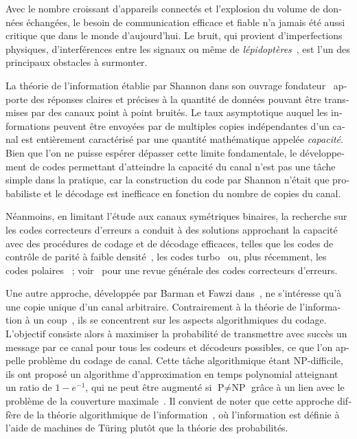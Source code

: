 \begin{otherlanguage}{french}
Avec le nombre croissant d'appareils connectés et l'explosion du volume de données échangées, le besoin de communication efficace et fiable n'a jamais été aussi critique que dans le monde d'aujourd'hui. Le bruit, qui provient d'imperfections physiques, d'interférences entre les signaux ou même de \emph{lépidoptères}~\cite{Hopper81}, est l'un des principaux obstacles à surmonter.

La théorie de l'information établie par Shannon dans son ouvrage fondateur~\cite{Shannon48} apporte des réponses claires et précises à la quantité de données pouvant être transmises par des canaux point à point bruités. Le taux asymptotique auquel les informations peuvent être envoyées par de multiples copies indépendantes d'un canal est entièrement caractérisé par une quantité mathématique appelée \emph{capacité}. Bien que l'on ne puisse espérer dépasser cette limite fondamentale, le développement de codes permettant d'atteindre la capacité du canal n'est pas une tâche simple dans la pratique, car la construction du code par Shannon n'était que probabiliste et le décodage est inefficace en fonction du nombre de copies du canal.

Néanmoins, en limitant l'étude aux canaux symétriques binaires, la recherche sur les codes correcteurs d'erreurs a conduit à des solutions approchant la capacité avec des procédures de codage et de décodage efficaces, telles que les codes de contrôle de parité à faible densité~\cite{Gallager62}, les codes turbo~\cite{BG96} ou, plus récemment, les codes polaires~\cite{Arikan09} ; voir~\cite{RU08} pour une revue générale des codes correcteurs d'erreurs.

Une autre approche, développée par Barman et Fawzi dans~\cite{BF18}, ne s'intéresse qu'à une copie unique d'un canal arbitraire. Contrairement à la théorie de l'information à un coup~\cite{RWW06,Tomamichel12,TBR16}, ils se concentrent sur les aspects algorithmiques du codage. L'objectif consiste alors à maximiser la probabilité de transmettre avec succès un message par ce canal pour tous les codeurs et décodeurs possibles, ce que l'on appelle problème du codage de canal. Cette tâche algorithmique étant \textrm{NP}-difficile, ils ont proposé un algorithme d'approximation en temps polynomial atteignant un ratio de $1-e^{-1}$, qui ne peut être augmenté si $\textrm{P}\not=\textrm{NP}$ grâce à un lien avec le problème de la couverture maximale~\cite{Feige98}. Il convient de noter que cette approche diffère de la théorie algorithmique de l'information~\cite{Chaitin77}, où l'information est définie à l'aide de machines de Türing plutôt que la théorie des probabilités.


\end{otherlanguage}
